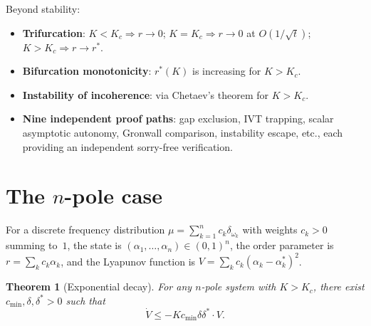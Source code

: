 \documentclass[11pt,a4paper]{article}
\newtheorem{theorem}{Theorem}[section]
\theoremstyle{definition}
\begin{document}
Beyond stability:
\begin{itemize}
\item \textbf{Trifurcation}: $K<K_c\Rightarrow r\to 0$; $K=K_c\Rightarrow r\to 0$ at $O(1/\sqrt{t})$; $K>K_c\Rightarrow r\to r^*$.
\item \textbf{Bifurcation monotonicity}: $r^*(K)$ is increasing for $K>K_c$.
\item \textbf{Instability of incoherence}: via Chetaev's theorem for $K>K_c$.
\item \textbf{Nine independent proof paths}: gap exclusion, IVT trapping, scalar asymptotic autonomy, Gronwall comparison, instability escape, etc., each providing an independent sorry-free verification.
\end{itemize}

\section{The $n$-pole case}\label{sec:npole}

For a discrete frequency distribution $\mu=\sum_{k=1}^n c_k\delta_{\omega_k}$ with weights $c_k>0$ summing to~$1$, the state is $(\alpha_1,\ldots,\alpha_n)\in(0,1)^n$, the order parameter is $r=\sum_k c_k\alpha_k$, and the Lyapunov function is $V=\sum_k c_k(\alpha_k-\alpha^*_k)^2$.

\begin{theorem}[Exponential decay]\label{thm:lyapunov}
For any $n$-pole system with $K>K_c$, there exist $c_{\min},\delta,\delta^*>0$ such that
\[
\dot V \leq -Kc_{\min}\delta\delta^*\cdot V.
\]
\end{theorem}
\end{document}
